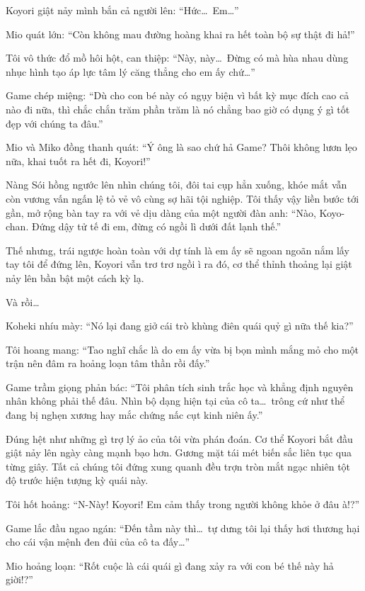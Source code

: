 \documentclass[../main.tex]{subfiles}
\begin{document}
Koyori giật nảy mình bắn cả người lên: ``Hức\dots\ Em\dots''

Mio quát lớn: ``Còn không mau đường hoàng khai ra hết toàn bộ sự thật đi hả!''

Tôi vô thức đổ mồ hôi hột, can thiệp: ``Này, này\dots\ Đừng có mà hùa nhau dùng nhục hình tạo áp lực tâm lý căng thẳng cho em ấy chứ\dots''

Game chép miệng: ``Dù cho con bé này có ngụy biện vì bất kỳ mục đích cao cả nào đi nữa, thì chắc chắn trăm phần trăm là nó chẳng bao giờ có dụng ý gì tốt đẹp với chúng ta đâu.''

Mio và Miko đồng thanh quát: ``Ý ông là sao chứ hả Game? Thôi không lươn lẹo nữa, khai tuốt ra hết đi, Koyori!''

Nàng Sói hồng ngước lên nhìn chúng tôi, đôi tai cụp hẳn xuống, khóe mắt vẫn còn vương vấn ngấn lệ tỏ vẻ vô cùng sợ hãi tội nghiệp. Tôi thấy vậy liền bước tới gần, mở rộng bàn tay ra với vẻ dịu dàng của một người đàn anh: ``Nào, Koyo-chan. Đứng dậy tử tế đi em, đừng có ngồi lì dưới đất lạnh thế.''

Thế nhưng, trái ngược hoàn toàn với dự tính là em ấy sẽ ngoan ngoãn nắm lấy tay tôi để đứng lên, Koyori vẫn trơ trơ ngồi ì ra đó, cơ thể thỉnh thoảng lại giật nảy lên bần bật một cách kỳ lạ.

Và rồi\dots

Koheki nhíu mày: ``Nó lại đang giở cái trò khùng điên quái quỷ gì nữa thế kia?''

Tôi hoang mang: ``Tao nghĩ chắc là do em ấy vừa bị bọn mình mắng mỏ cho một trận nên đâm ra hoảng loạn tâm thần rồi đấy.''

Game trầm giọng phản bác: ``Tôi phân tích sinh trắc học và khẳng định nguyên nhân không phải thế đâu. Nhìn bộ dạng hiện tại của cô ta\dots\ trông cứ như thể đang bị nghẹn xương hay mắc chứng nấc cụt kinh niên ấy.''

Đúng hệt như những gì trợ lý ảo của tôi vừa phán đoán. Cơ thể Koyori bắt đầu giật nảy lên ngày càng mạnh bạo hơn. Gương mặt tái mét biến sắc liên tục qua từng giây. Tất cả chúng tôi đứng xung quanh đều trợn tròn mắt ngạc nhiên tột độ trước hiện tượng kỳ quái này.

Tôi hốt hoảng: ``N-Này! Koyori! Em cảm thấy trong người không khỏe ở đâu à!?''

Game lắc đầu ngao ngán: ``Đến tầm này thì\dots\ tự dưng tôi lại thấy hơi thương hại cho cái vận mệnh đen đủi của cô ta đấy\dots''

Mio hoảng loạn: ``Rốt cuộc là cái quái gì đang xảy ra với con bé thế này hả giời!?''
\end{document}
